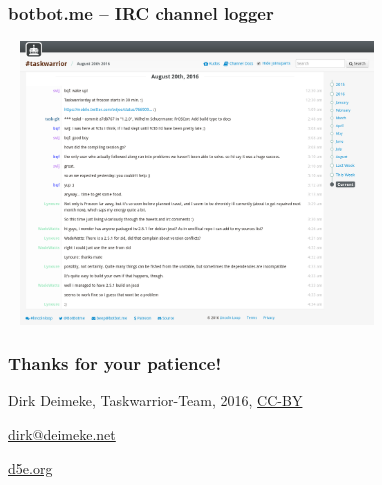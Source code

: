 \documentclass[t,handout]{beamer}
\begin{document}
\begin{frame}\frametitle{botbot.me -- IRC channel logger}
    \begin{center}
        \href{https://botbot.me/freenode/taskwarrior/}{\includegraphics[width=10cm,height=7.5cm]{botbot-me-taskwarrior.png}}
    \end{center}
\end{frame}


\begin{frame}[fragile]\frametitle{Thanks for your patience!}
    \vfill
    \begin{center}
        Dirk Deimeke, Taskwarrior-Team, 2016, \href{https://creativecommons.org/licenses/by/4.0/}{CC-BY}

        \href{mailto:dirk@deimeke.net}{dirk@deimeke.net}

        \href{https://d5e.org/}{d5e.org}
    \end{center}
\end{frame}
\end{document}
